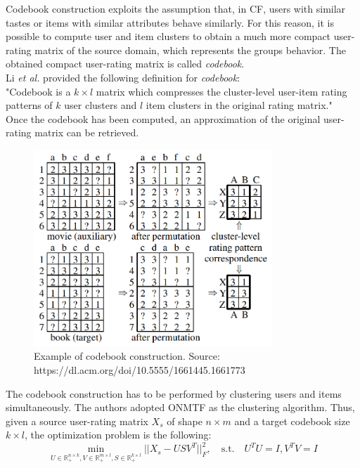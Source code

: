 Codebook construction exploits the assumption that, in CF, users with similar tastes or items with similar attributes behave similarly. For this reason, it is possible to compute user and item clusters to obtain a much more compact user-rating matrix of the source domain, which represents the groups behavior. The obtained compact user-rating matrix is called \textit{codebook}.\\
Li \textit{et al.} provided the following definition for \textit{codebook}:\\
"Codebook is a $k \times l$ matrix which compresses the cluster-level user-item rating patterns of $k$
user clusters and $l$ item clusters in the original rating matrix."\\
Once the codebook has been computed, an approximation of the original user-rating matrix can be retrieved.\par
\begin{figure}[hbt!]
  \centering
  \includegraphics[width=0.8\textwidth]{pictures/codebook-construction}
  \caption{Example of codebook construction. Source: https://dl.acm.org/doi/10.5555/1661445.1661773}
\end{figure}
The codebook construction has to be performed by clustering users and items simultaneously. The authors adopted ONMTF \cite{10.1145/1150402.1150420} as the clustering algorithm. Thus, given a source user-rating matrix $X_s$ of shape $n \times m$ and a target codebook size $k \times l$, the optimization problem is the following:
\begin{equation}
\min_{U \in \mathbb{R}^{n \times k}_+, V \in \mathbb{R}^{m \times l}_+, S \in \mathbb{R}^{k \times l}_+} ||X_s - U S V^T||^2_F, \quad \text{s.t.} \quad U^TU = I, V^TV = I
\end{equation}
